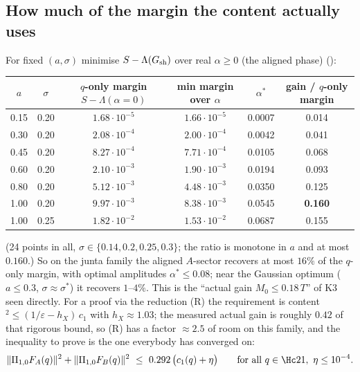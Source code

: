 \subsection{How much of the margin the content actually uses}
For fixed $(a,\sigma)$ minimise $S-\Lambda(G_{\rm sh})$ over real $\alpha\ge0$ (the aligned phase) ():
\begin{center}\small
\begin{tabular}{cccccc}\toprule
$a$ & $\sigma$ & $q$-only margin $S-\Lambda(\alpha=0)$ & min margin over $\alpha$ & $\alpha^*$ & gain / $q$-only margin\\\midrule
0.15 & 0.20 & $1.68\cdot10^{-5}$ & $1.66\cdot10^{-5}$ & 0.0007 & 0.014\\
0.30 & 0.20 & $2.08\cdot10^{-4}$ & $2.00\cdot10^{-4}$ & 0.0042 & 0.041\\
0.45 & 0.20 & $8.27\cdot10^{-4}$ & $7.71\cdot10^{-4}$ & 0.0105 & 0.068\\
0.60 & 0.20 & $2.10\cdot10^{-3}$ & $1.90\cdot10^{-3}$ & 0.0194 & 0.093\\
0.80 & 0.20 & $5.12\cdot10^{-3}$ & $4.48\cdot10^{-3}$ & 0.0350 & 0.125\\
1.00 & 0.20 & $9.97\cdot10^{-3}$ & $8.38\cdot10^{-3}$ & 0.0545 & \textbf{0.160}\\
1.00 & 0.25 & $1.82\cdot10^{-2}$ & $1.53\cdot10^{-2}$ & 0.0687 & 0.155\\\bottomrule
\end{tabular}
\end{center}
(24 points in all, $\sigma\in\{0.14,0.2,0.25,0.3\}$; the ratio is monotone in $a$ and at most $0.160$.) So on the junta family the aligned $A$-sector recovers at most $16\%$ of the
$q$-only margin, with optimal amplitudes $\alpha^*\le0.08$; near the Gaussian optimum ($a\le0.3$, $\sigma\approx\sigma^*$) it recovers $1$--$4\%$. This is the ``actual gain
$M_0\le0.18\,T$'' of K3 seen directly. For a proof via the reduction (R) the requirement is content$^2\le(1/\varepsilon-h_X)\,c_1$ with $h_X\approx1.03$; the measured actual gain is
roughly $0.42$ of that rigorous bound, so (R) has a factor $\approx2.5$ of room on this family, and the inequality to prove is the one everybody has converged on:
\[
\|\Pi_{1,0}F_A(q)\|^2+\|\Pi_{1,0}F_B(q)\|^2\ \le\ 0.292\,\bigl(c_1(q)+\eta\bigr)\qquad\text{for all }q\in\Hc21,\ \eta\le10^{-4}.
\]

